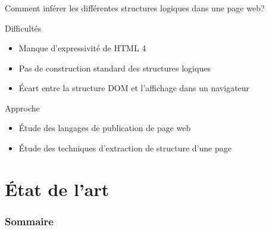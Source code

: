 \documentclass[]{beamer}
\begin{document}
\begin{frame}
	\frametitle{}
	\begin{block}{}
	Comment inférer les différentes structures logiques dans une page web?
	\end{block}
	\begin{block}{Difficultés}
		\begin{itemize}
			\item Manque d'expressivité de HTML 4
			\item Pas de construction standard des structures logiques
			\item Écart entre la structure DOM et l'affichage dans un navigateur
		\end{itemize}
	\end{block}
	\begin{block}{Approche}
		\begin{itemize}
			\item Étude des langages de publication de page web
			\item Étude des techniques d'extraction de structure d'une page
		\end{itemize}
	\end{block}
\end{frame}


\section{État de l'art}

\begin{frame}
  \frametitle{Sommaire}
\end{frame}
\end{document}

